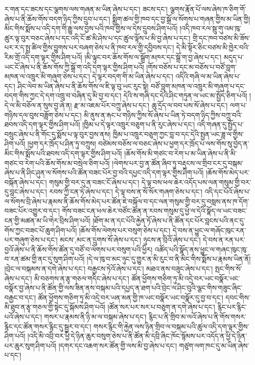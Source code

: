 ར་གན་དང་ཟངས་དང་ལྕགས་ལས་གཞན་མ་ཡིན་ཞེས་པ་དང་། ཟངས་དང་། ལྕགས་རྣོན་པོ་ལས་ཞེས་ཁ་ཅིག་གོ་ཞེས་པ་ནི་ཆོས་གོས་བདག་ཉིད་ཀྱིས་དྲུབ་པ་དང་། སྨྱིག་ཚལ་གྱི་ཁབ་དང་བྱ་སྒྲོ་ལ་སོགས་པ་གཞན་གྱིས་མ་ཡིན་གྱི། མིང་གིས་སྨོས་པ་འདི་དག་གི་རྒྱུ་ལས་བྱས་པའི་ཁབ་གྱིས་ལ་དེས་དྲུབས་ཤིག་པའོ། །འདི་ཁབ་རལ་སྦུ་གུ་འམ་ཁུ་ཚུར་ལྟ་བུར་བཅང་ཞེས་པ་དང་འདི་ངོ་ཚ་མི་ཤེས་པ་དང་ཚུལ་ལྟོས་པ་མི་བྱ་ཞེས་པ་དང་། གྲི་དང་ཁབ་བཙས་མི་ཟོས་པར་ར་ད་སྤྲ་ཚིལ་གྱིས་བྱུགས་པར་བཞག་ཅེས་པ་ནི་ཁབ་རལ་གྱི་དབྱིབས་དང་། དེ་མི་སྟོར་ཅིང་བཙས་མི་ཁྱེར་བའི་རིམ་གྲོ་འདི་དག་ལྟར་གྱིས་ཤིག་པའོ། །མི་ལྟུང་བར་ཆོས་གོས་ལ་སྒྲོག་མཁར་དང་སྒྲོ་ག་བྱ་ཞེས་པ་དང་། མདུད་པ་ཡང་ངོ་ཞེས་པ་ནི་ཆོས་གོས་ཀྱི་སྒྲོ་ག་འདི་དག་ལྟར་གྱིས་ཤིག་པའོ། །གོས་བཅོས་པ་དང་མ་བཅོས་པ་བཙོ་བླག་མཁན་ལ་འཁྲུར་མི་གཞུག་ཅེས་པ་དང་། དེ་ལྟར་བདག་གི་མ་ཡིན་ཞེས་པ་དང་། འདིའི་གཞི་ལ་མ་ཡིན་ཞེས་པ་དང་། ཤིང་ལེབ་མ་ཡིན་ཞེས་པ་ནི་ཆོས་གོས་ལ་ཇི་ལྟ་བུ་ཡང་རུང་སྟེ། བཙོ་བླག་མཁན་ལ་འཁྲུར་མི་གཞུག་པ་དང་བདག་གིས་ཀྱང་དེ་དག་འཁྲུ་བ་བཞིན་དུ་མི་བྱ་བ་དང་། དེའི་ས་གཞི་དང་དེའི་ཤིང་གཏུན་ལ་ཡང་མ་སྤྱོད་ཅིག་པའོ། །དེ་ལ་མི་བཅོལ་ན་སུས་བྱ་ཞེ་ན། རྫ་མ་འཇམ་པོར་བཀྲུ་ཞེས་པ་དང་། ཆུ་དྲོད་ལ་བབ་པས་སོ་ཞེས་པ་དང་། ལག་པ་གཉིས་དལ་བུས་བཟློག་ཅེས་པ་དང་། མི་ནུས་ན་རྐང་པ་གཉིས་ཀྱིས་སོ་ཞེས་པ་ཡིན་ཏེ་བདག་ཉིད་ཀྱིས་བཀྲུ་བའི་ཐབས་འདི་དག་ལྟར་གྱིས་ཤིག་པའོ། །ཁྱིམ་པ་དེ་ལྟར་འཁྲུར་བཅུག་པ་ནི་རུང་ཞེས་པ་དང་། འདི་གཞན་དུ་སྤྱོད་པ་བསྲུང་ཞེས་པ་ནི་གོང་དུ་སྨོས་པ་ལྟ་བུར་བྱས་ནས། ཁྱིམ་པ་འཁྲུར་བཅུག་ཀྱང་བླ་བ་དང་དེའི་སྤྱན་ཡང་ཟླ་ལ་གྱིས་ཤིག་པའོ། །ཕྱག་དར་ཁྲོད་པ་ཤིན་ཏུ་བཀྲུས། བཙེམས་བཅོས་ལ་བཅང་ཞེས་པ་ཕྱག་དར་ཁྲོད་པ་ལས་གོས་སུ་བྱེད་ན་མིང་གིས་སྨོས་པའི་ཐབས་འདི་དག་ལྟར་གྱིས་ཤིག་པའོ། །ཆོས་གོས་མི་གཙང་བ་རེག་པ་མ་ཡིན་ཞེས་པ་ནི་མི་གཙང་བ་རེག་པའི་ཆོས་གོས་མ་བསྲེལ་ཅིག་པའོ། །ལེགས་པར་བྱ་ན་ཚོན་ཞིབ་ཏུ་བརྡུངས་ལ་གྲིབ་ངར་དུ་བསྐམ་ཞེས་པ་ནི་ཤིང་ཤུན་ལ་སོགས་པའི་ཚོན་བཟང་པོར་བྱ་བའི་དཔྱང་འདི་དག་ལྟར་གྱིས་ཤིག་པའོ། །ཆོས་གོས་མེད་པར་བསྐོན་ཞེས་པ་དང་། གསུམ་གྱི་བར་དུ་ན་བཟང་ངོ་ཞེས་པ་དང་། དེ་ལྟ་བས་ཕལ་ཆེར་འདོད་པས་ལན་གསུམ་གྱི་བར་དུ་བླང་ཞེས་པ་དང་། རབས་ཀྱི་ངན་ཏེ་ཞེས་པ་དང་། དེ་ལྟ་བས་ན་སོ་སོར་གཞག་ཅེས་པ་དང་། འདི་དང་པོའོ་ཞེས་པ་ལ་སོགས་བྲི་ཞེས་པ་རྣམས་ནི་ཆོས་གོས་མེད་པར་ཚོན་ཇེ་བསྐོལ་བ་དང་ལན་གསུམ་གྱི་བར་དུ་བསླས་ནས་ཁ་དོག་བཟང་པོར་འགྱུར་བ་དང་། གོས་བཟང་ངན་ཕལ་ཆེར་བཙོང་ཚོན་ན་རབས་གསུམ་དུ་ཕྱེ་ལ་དེའི་སྣོད་ལ་ཡང་བཟང་ངན་གྱི་མཚན་མ་ཡི་གེར་བྲིས་ཤིག་པའོ། །ཐོག་མ་ན་དང་པོའི་རྐྱེན་ཏོ་ཞེས་པ་ནི་ཚོན་དང་པོར་བླངས་པའི་ནང་དུ་གོས་ཀྱང་བཟང་པོ་ཆུག་ཤིག་པའོ། །ཆོས་གོས་ལེགས་པར་བསུག་ཅེས་པ་དང་། དེ་བས་ན་ཕྱུང་ལ་གཞོང་ཁུང་རན་པར་གཞུག་ཅེས་པ་དང་། {མངས་,མང་}ན་དྲུགས་སོ་ཞེས་པ་དང་། ཉུངས་ན་བྲིའོ་ཞེས་པ་དང་། དེ་བས་ན་རན་པར་བྱའོ་ཞེས་པ་ནི་ཆོས་གོས་ཚོན་དུ་བཙོ་བ་ལེགས་པར་བསུག་པའི་ཕྱིར། འཚོད་པའི་སྣོད་ནས་ཕྱུང་ལ་གཞང་ཁུང་ཁུ་བ་རན་ཚམ་གྱི་ནང་དུ་སུག་ཤིག་པའོ། །དེ་ལ་ཁུ་བ་མང་ཉུང་དུ་གྱུར་ན་མི་རུང་བ་ནི་མིང་གིས་སྨོས་པ་རྣམས་ཡིན་ནོ། །བྲེང་ལ་བསྐམས་ན་དགེ་ཞེས་པ་དང་། བརྒྱངས་ཏེའོ་ཞེས་པ་དང་། མཐའ་ནས་བཟུང་ཞེས་པ་དང་། སྤང་གིས་སོ་ཞེས་པ་དང་། མི་བཅགས་ན་རྩྭ་གཅལ་གདིང་ཞེས་པ་དང་། ཚོན་ཕྱོགས་གཅིག་ཏུ་མི་འདྲེ་བར་ཡང་བསྣོར་ཡང་བསྣོར་བྱ་ཞེས་པ་ནི་ཚོན་གྱི་ལས་ཟིན་ནས་བསྐམ་པའི་དཔྱད་ན་ཐག་པའི་བྲེང་ལ་ཤིང་བུའི་ལྕང་གིས་གཟུང་ཞིང་བརྒྱང་བ་དང་། ཚོན་ཕྱོགས་གཅིག་ཏུ་མི་འདྲེ་བར་ཡན་མན་གྱི་ཁ་ཡང་བསྣོར་ཡང་བསྣོར་དུ་བྱ་བ་དང་། དབང་གིས་མི་ཐུབ་ན་རྩྭ་གཅལ་གྱི་སྟེང་དུ་སྐོམས་ཤིག་པའོ། །ཚོན་སར་པར་སར་པ་བཅུག་ན་དགེ་ཞེས་པ་དང་། རྙིང་པར་རྙིང་པའོ་ཞེས་པ་དང་། གསར་པ་རྣམས་ནི་ཉི་མ་ལ་བསྐམ་ཞེས་པ་དང་། རྙིང་པ་ནི་གྲིབ་མ་ལའོ་ཞེས་པ་ནི་གོས་གསར་རྙིང་དང་ཚོན་གསར་རྙིང་དུ་སྦྱར་བ་དང་། གསར་རྙིང་གི་རྐྱེན་ལས་ཉིན་གྲིབ་ལ་བསྐམ་པའི་ཚུལ་འདི་དག་ལྟར་གྱིས་ཤིག་པའོ། །འདི་མི་འབྲི་བར་ཕྱི་དེ་ཉིན་ཆུར་བསུག་ཅེས་པ་ནི་ཚོན་མི་དབྲི་ཞིང་ཁོང་སྙོམས་པར་འདོད་ན་ཕྱི་དེ་ཉིན་པར་ཆུར་སུག་ཤིག་པའོ། །དགར་དང་འཆག་སར་ཚོན་གྱི་ལས་མི་བྱ་ཞེས་པ་དང་། གཙུག་ལག་ཁང་དུ་མ་ཡིན་ཞེས་པ་དང་། 